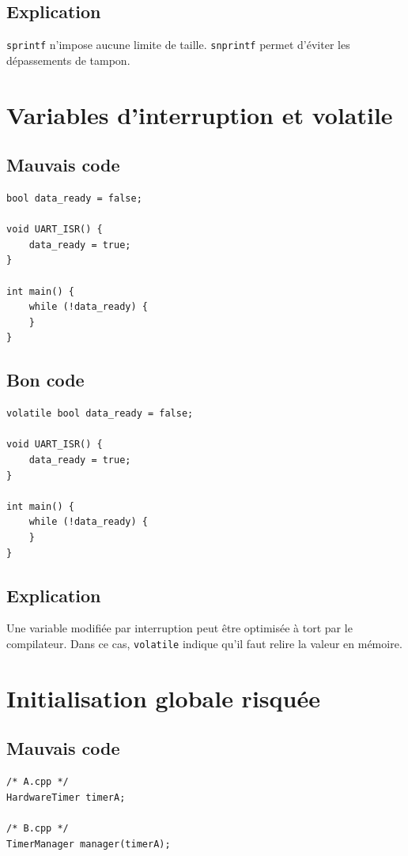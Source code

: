 \documentclass[a4paper,11pt]{report}
\begin{document}
\section{Explication}
\texttt{sprintf} n'impose aucune limite de taille.
\texttt{snprintf} permet d'éviter les dépassements de tampon.

\chapter{Variables d'interruption et volatile}

\section{Mauvais code}
\begin{lstlisting}
bool data_ready = false;

void UART_ISR() {
    data_ready = true;
}

int main() {
    while (!data_ready) {
    }
}
\end{lstlisting}

\section{Bon code}
\begin{lstlisting}
volatile bool data_ready = false;

void UART_ISR() {
    data_ready = true;
}

int main() {
    while (!data_ready) {
    }
}
\end{lstlisting}

\section{Explication}
Une variable modifiée par interruption peut être optimisée à tort par le compilateur.
Dans ce cas, \texttt{volatile} indique qu'il faut relire la valeur en mémoire.

\chapter{Initialisation globale risquée}

\section{Mauvais code}
\begin{lstlisting}
/* A.cpp */
HardwareTimer timerA;

/* B.cpp */
TimerManager manager(timerA);
\end{lstlisting}
\end{document}
